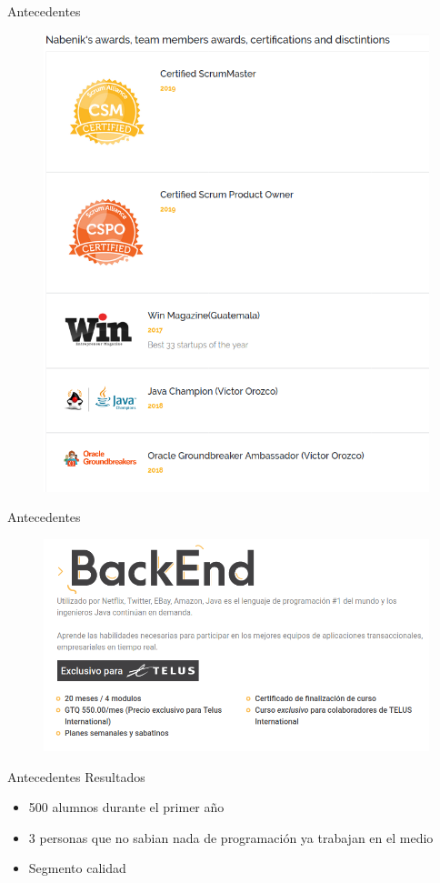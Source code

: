 \documentclass[aspectratio=169]{beamer}
\begin{document}
\begin{frame}[fragile]{Antecedentes}
	\begin{figure}
		\centering
		\includegraphics[width=0.5\linewidth]{Images/awards}
	\end{figure}
\end{frame}

\begin{frame}[fragile]{Antecedentes}
\begin{figure}
	\centering
	\includegraphics[width=0.9\linewidth]{Images/backendviejo}
\end{figure}
\end{frame}

\begin{frame}[fragile]{Antecedentes}
	Resultados
	\begin{itemize}
		\item 500 alumnos durante el primer año
		\item 3 personas que no sabian nada de programación ya trabajan en el medio
		\item Segmento calidad
	\end{itemize}	
\end{frame}
\end{document}
